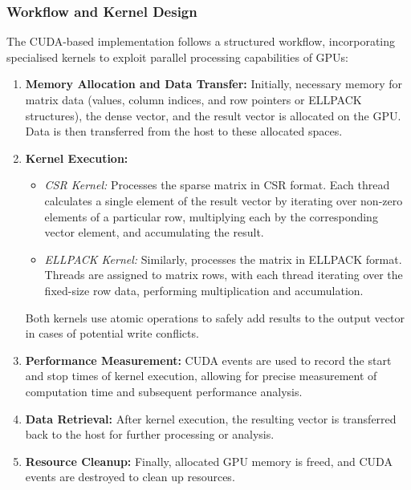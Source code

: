 \documentclass[12pt,oneside]{book} %
\begin{document}
\subsubsection{Workflow and Kernel Design}

The CUDA-based implementation follows a structured workflow, incorporating
specialised kernels to exploit parallel processing capabilities of GPUs:

\begin{enumerate}
    \item \textbf{Memory Allocation and Data Transfer:} Initially, necessary memory for matrix data (values, column indices, and row pointers or ELLPACK structures), the dense vector, and the result vector is allocated on the GPU. Data is then transferred from the host to these allocated spaces.

    \item \textbf{Kernel Execution:}
          \begin{itemize}
              \item \textit{CSR Kernel:} Processes the sparse matrix in CSR format. Each thread calculates a single element of the result vector by iterating over non-zero elements of a particular row, multiplying each by the corresponding vector element, and accumulating the result.
              \item \textit{ELLPACK Kernel:} Similarly, processes the matrix in ELLPACK format. Threads are assigned to matrix rows, with each thread iterating over the fixed-size row data, performing multiplication and accumulation.
          \end{itemize}
          Both kernels use atomic operations to safely add results to the output vector in cases of potential write conflicts.

    \item \textbf{Performance Measurement:} CUDA events are used to record the start and stop times of kernel execution, allowing for precise measurement of computation time and subsequent performance analysis.

    \item \textbf{Data Retrieval:} After kernel execution, the resulting vector is transferred back to the host for further processing or analysis.

    \item \textbf{Resource Cleanup:} Finally, allocated GPU memory is freed, and CUDA events are destroyed to clean up resources.
\end{enumerate}
\end{document}
